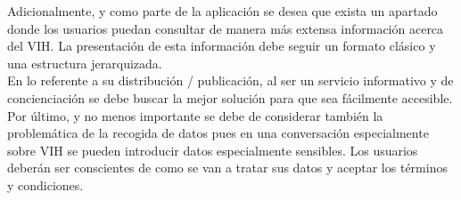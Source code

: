 Adicionalmente, y como parte de la aplicación se desea que exista un apartado donde los usuarios puedan consultar de manera más extensa información acerca del VIH. La presentación de esta información debe seguir un formato clásico y una estructura jerarquizada.\\

En lo referente a su distribución / publicación, al ser un servicio informativo y de concienciación se debe buscar la mejor solución para que sea fácilmente accesible. Por último, y no menos importante se debe de considerar también la problemática de la recogida de datos pues en una conversación especialmente sobre VIH se pueden introducir datos especialmente sensibles. Los usuarios deberán ser conscientes de como se van a tratar sus datos y aceptar los términos y condiciones.\\



